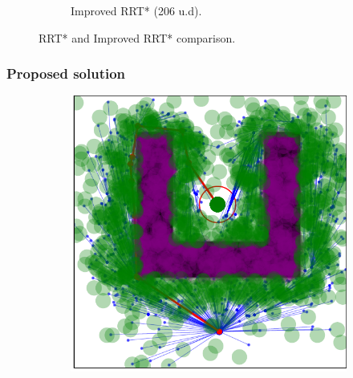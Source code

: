 \documentclass{beamer}
\begin{document}
\begin{frame}
\begin{figure}[!ht]
\begin{subfigure}[b]{0.45\textwidth}
			\caption{Improved RRT* (206 u.d).}
			\label{fig:rrtstarML_maze}
		\end{subfigure}
		\caption{RRT* and Improved RRT* comparison.}
		\label{fig:RRTstar_vs_RRTstarML}
	  \end{figure}
\end{frame}	

\begin{frame}
	\frametitle{Proposed solution}	
	\begin{figure}[!ht]
		\centering 
		\begin{subfigure}[b]{0.45\textwidth}
			\includegraphics[width=\textwidth]{figChap4/RRTstarML_learning206.0.pdf}
			 

\end{subfigure}
\end{figure}
\end{frame}
\end{document}

